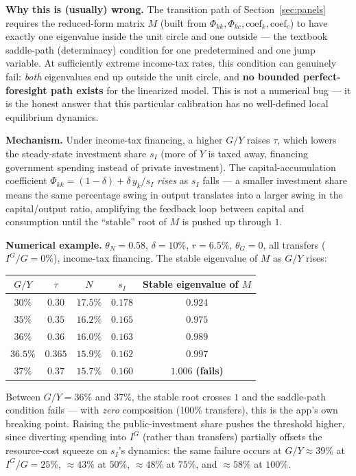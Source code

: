 \documentclass[11pt]{article}
\begin{document}
\textbf{Why this is (usually) wrong.} The transition path of
Section~\ref{sec:panels} requires the reduced-form matrix $M$ (built from
$\Phi_{kk},\Phi_{kc},\text{coef}_k,\text{coef}_c$) to have exactly one
eigenvalue inside the unit circle and one outside --- the textbook
saddle-path (determinacy) condition for one predetermined and one
jump variable. At sufficiently extreme income-tax rates, this condition
can genuinely fail: \emph{both} eigenvalues end up outside the unit
circle, and \textbf{no bounded perfect-foresight path exists} for the
linearized model. This is not a numerical bug --- it is the honest answer
that this particular calibration has no well-defined local equilibrium
dynamics.

\textbf{Mechanism.} Under income-tax financing, a higher $G/Y$ raises
$\tau$, which lowers the steady-state investment share $s_I$ (more of $Y$
is taxed away, financing government spending instead of private
investment). The capital-accumulation coefficient
$\Phi_{kk}=(1-\delta)+\delta\,y_k/s_I$ \emph{rises} as $s_I$ falls --- a
smaller investment share means the same percentage swing in output
translates into a larger swing in the capital/output ratio, amplifying
the feedback loop between capital and consumption until the ``stable''
root of $M$ is pushed up through $1$.

\begin{casebox}
\textbf{Numerical example.} $\theta_N=0.58$, $\delta=10\%$, $r=6.5\%$,
$\theta_G=0$, all transfers ($I^G/G=0\%$), income-tax financing. The
stable eigenvalue of $M$ as $G/Y$ rises:
\begin{center}
\begin{tabular}{ccccc}
\toprule
$G/Y$ & $\tau$ & $N$ & $s_I$ & Stable eigenvalue of $M$ \\
\midrule
$30\%$ & $0.30$ & $17.5\%$ & $0.178$ & $0.924$ \\
$35\%$ & $0.35$ & $16.2\%$ & $0.165$ & $0.975$ \\
$36\%$ & $0.36$ & $16.0\%$ & $0.163$ & $0.989$ \\
$36.5\%$ & $0.365$ & $15.9\%$ & $0.162$ & $0.997$ \\
$37\%$ & $0.37$ & $15.7\%$ & $0.160$ & $1.006$ \textbf{(fails)} \\
\bottomrule
\end{tabular}
\end{center}
Between $G/Y=36\%$ and $37\%$, the stable root crosses $1$ and the
saddle-path condition fails --- with \emph{zero} composition (100\%
transfers), this is the app's own breaking point. Raising the
public-investment share pushes the threshold higher, since diverting
spending into $I^G$ (rather than transfers) partially offsets the
resource-cost squeeze on $s_I$'s dynamics: the same failure occurs at
$G/Y\approx 39\%$ at $I^G/G=25\%$, $\approx 43\%$ at $50\%$,
$\approx 48\%$ at $75\%$, and $\approx 58\%$ at $100\%$.
\end{casebox}
\end{document}
